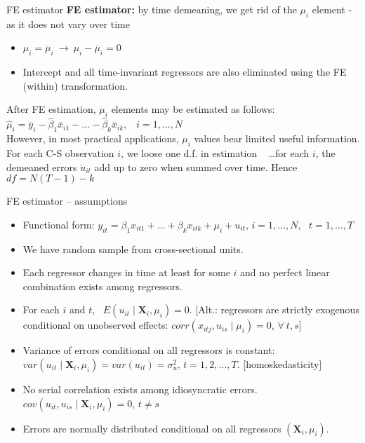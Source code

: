 \documentclass{beamer}
\begin{document}
\begin{frame}{FE estimator}
\textbf{FE estimator:} by time demeaning, we get rid of the $\mu_i$ element - as it does not vary over time 
\vspace{0.5cm}
\begin{itemize}
\item $\mu_i = \overline{\mu}_i \ \rightarrow \ \mu_i - \overline{\mu}_i = 0$
\item Intercept and all time-invariant regressors are also eliminated using the FE (within) transformation.
\end{itemize}
\vspace{0.5cm}
After FE estimation, $\mu_i$ elements may be estimated as follows:
$\hat{\mu}_i =\overline{y}_i - \hat{\beta}_1 \overline{x}_{i1} - \dots - \hat{\beta}_k \overline{x}_{ik},$ \ $i = 1, \dots, N$ \\
\vspace{0.5cm}
However, in most practical applications, $\mu_i$ values bear limited useful information.\\ \medskip
For each C-S observation $i$, we loose one d.f. in estimation ~ \dots for each $i$, the demeaned errors $\ddot{u}_{it}$ add up to zero when summed over time. Hence \ $df = N(T-1)-k$
\end{frame}
\begin{frame}{FE estimator – assumptions}
\begin{itemize}
\item[\textbf{FE.1}] Functional form: $y_{it} = \beta_1 x_{it1} + \dots + \beta_k x_{itk} + \mu_i + u_{it}$, $i = 1, \dots, N$, \ $t = 1, \dots, T$
\item[\textbf{FE.2}] We have random sample from cross-sectional units.
\item[\textbf{FE.3}] Each regressor changes in time at least for some $i$ and no perfect linear combination exists among regressors.
\item[\textbf{FE.4}] For each $i$ and $t$, \ $E (u_{it} \mid \bm{X}_i, \mu_i) = 0$. [Alt.: regressors are strictly exogenous conditional on unobserved effects: $\textit{corr}(x_{itj}, u_{is} \mid \mu_i)=0$, \quad $\forall \ t, s$]
\item[\textbf{FE.5}] Variance of errors conditional on all regressors is constant: $\textit{var}(u_{it} \mid \bm{X}_i, \mu_i) = \textit{var}(u_{it}) = \sigma^2_u$, \quad $t= 1,2, \dots, T$. [homoskedasticity]
\item[\textbf{FE.6}] No serial correlation exists among idiosyncratic errors. $\textit{cov}(u_{it}, u_{is} \mid \bm{X}_i, \mu_i) = 0$, \quad $t \neq s$
\item[\textbf{FE.7}] Errors are normally distributed conditional on all regressors $(\bm{X}_i, \mu_i)$.
\end{itemize}
\end{frame}
\end{document}
